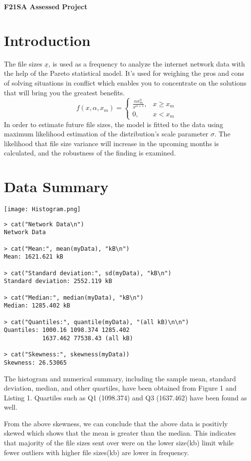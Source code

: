 \documentclass[11pt]{article}
\begin{document}
\begin{center}
    \huge\textbf{F21SA Assessed Project}
\end{center}
\section{Introduction}
The file sizes $\underline{x}$, is used as a frequency to analyze the internet network data with the help of the Pareto statistical model. It's used for weighing the pros and cons of solving situations in conflict which enables you to concentrate on the solutions that will bring you the greatest benefits.
\begin{equation}
f\left(x, \alpha, x_{m}\right)= \begin{cases}\frac{\alpha x_{m}^{\alpha}}{x^{\alpha+1}}, & x \geq x_{m} \\ 0, & x<x_{m}\end{cases}
\end{equation}
In order to estimate future file sizes, the model is fitted to the data using maximum likelihood estimation of the distribution's scale parameter $\sigma$. The likelihood that file size variance will increase in the upcoming months is calculated, and the robustness of the finding is examined.

\section{Data Summary}
\begin{minipage}{0.4\textwidth}
    \centering
    \texttt{[image: Histogram.png]}
\end{minipage}%
\begin{minipage}{0.4\textwidth}
    \centering
    \footnotesize
    \begin{lstlisting}[caption={Summary \& Standard Deviation},captionpos=b]
> cat("Network Data\n")
Network Data

> cat("Mean:", mean(myData), "kB\n")
Mean: 1621.621 kB

> cat("Standard deviation:", sd(myData), "kB\n")
Standard deviation: 2552.119 kB

> cat("Median:", median(myData), "kB\n")
Median: 1285.402 kB

> cat("Quantiles:", quantile(myData), "(all kB)\n\n")
Quantiles: 1000.16 1098.374 1285.402 
           1637.462 77538.43 (all kB)
           
> cat("Skewness:", skewness(myData))
Skewness: 26.53065
    \end{lstlisting}
\end{minipage}
\par The histogram and numerical summary, including the sample mean, standard deviation, median, and other quartiles, have been obtained from Figure 1 and Listing 1. Quartiles such as Q1 (1098.374) and Q3 (1637.462) have been found as well.
\par From the above skewness, we can conclude that the above data is positivly skewed which shows that the mean is greater than the median. This indicates that majority of the file sizes sent over were on the lower size(kb) limit while fewer outliers with higher file sizes(kb) are lower in frequency.
\end{document}
